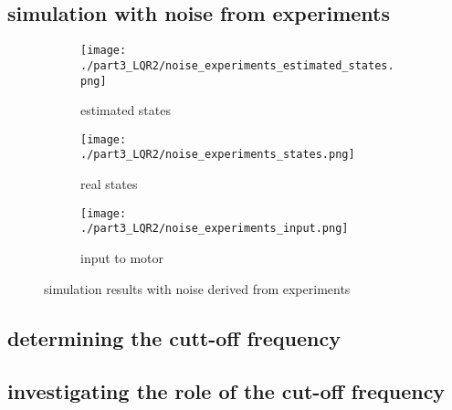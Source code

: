 \subsection{simulation with noise from experiments}
	\begin{figure}[H]
		\centering
		\begin{subfigure}[b]{0.45\textwidth}
			\texttt{[image: ./part3\_LQR2/noise\_experiments\_estimated\_states.png]}
			\caption{estimated states}
		\end{subfigure}
		\begin{subfigure}[b]{0.45\textwidth}
			\texttt{[image: ./part3\_LQR2/noise\_experiments\_states.png]}
			\caption{real states}
		\end{subfigure}
		\begin{subfigure}[b]{0.45\textwidth}
			\texttt{[image: ./part3\_LQR2/noise\_experiments\_input.png]}
			\caption{input to motor}
		\end{subfigure}
		\caption{simulation results with noise derived from experiments}
	\end{figure}
\subsection{determining the cutt-off frequency}
\subsection{investigating the role of the cut-off frequency}